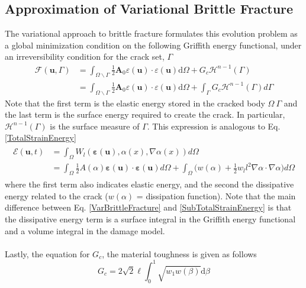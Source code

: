 \documentclass[12pt,3p]{article}
\numberwithin{equation}{section}
\begin{document}
\subsection{Approximation of Variational Brittle Fracture}
The variational approach to brittle fracture formulates this evolution problem as a global minimization condition on the following Griffith energy functional, under an irreversibility condition for the crack set, $\Gamma$
\begin{align}\label{VarBrittleFracture}
\mathcal{F}(\mathbf{u}, \Gamma) 
&= \int_{\Omega \backslash \Gamma} \frac{1}{2} \mathbf{A}_{0} \varepsilon(\mathbf{u}) \cdot \varepsilon(\mathbf{u}) \mathrm{d} \Omega+G_{c} \mathcal{H}^{n-1}(\Gamma) \\
&= \int_{\Omega \backslash \Gamma} \frac{1}{2} \mathbf{A}_{0} \varepsilon(\mathbf{u}) \cdot \varepsilon(\mathbf{u}) \mathrm{d} \Omega + \int_{\Gamma} G_{c} \mathcal{H}^{n-1}(\Gamma) d \Gamma
\end{align}
Note that the first term is the elastic energy stored in the cracked body $\Omega \ \Gamma$ and the last term is the surface energy required to create the crack. In particular, $\mathcal{H}^{n-1}(\Gamma)$ is the surface measure of $\Gamma$. This expression is analogous to Eq. \ref{TotalStrainEnergy}
\begin{align}\label{SubTotalStrainEnergy}
\begin{split}
\mathcal{E} (\mathbf{u}, t) 
&= \int_{\Omega} W_l (\boldsymbol{\varepsilon} (\mathbf{u}), \alpha (x), \nabla \alpha (x)) d \Omega \\
&= \int_{\Omega} \frac{1}{2} A (\alpha) \boldsymbol{\varepsilon} (\mathbf{u}) \cdot \boldsymbol{\varepsilon} (\mathbf{u}) d \Omega + \int_{\Omega}  \big( w (\alpha) + \frac{1}{2} w_l l^2 \nabla \alpha \cdot \nabla \alpha \big) d \Omega
\end{split}
\end{align}
where the first term also indicates elastic energy, and the second the dissipative energy related to the crack ($w(\alpha)$ = dissipation function). Note that the main difference between Eq. \ref{VarBrittleFracture} and \ref{SubTotalStrainEnergy} is that the dissipative energy term is a surface integral in the Griffith energy functional and a volume integral in the damage model. \\ \\ 
Lastly, the equation for $G_c$, the material toughness is given as follows 
\begin{equation}\label{MatTough}
G_{c} = 2 \sqrt{2} \ell  \int_{0}^{1} \sqrt{w_{1} w(\beta)} \mathrm{d} \beta
\end{equation}
\end{document}
